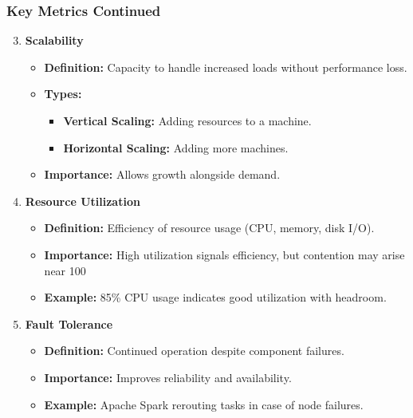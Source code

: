 \documentclass[aspectratio=169]{beamer}
\begin{document}
\begin{frame}[fragile]
    \frametitle{Key Metrics Continued}
    \begin{enumerate}
        \setcounter{enumi}{2}
        \item \textbf{Scalability}
            \begin{itemize}
                \item \textbf{Definition:} Capacity to handle increased loads without performance loss.
                \item \textbf{Types:}
                    \begin{itemize}
                        \item \textbf{Vertical Scaling:} Adding resources to a machine.
                        \item \textbf{Horizontal Scaling:} Adding more machines.
                    \end{itemize}
                \item \textbf{Importance:} Allows growth alongside demand.
            \end{itemize}

        \item \textbf{Resource Utilization}
            \begin{itemize}
                \item \textbf{Definition:} Efficiency of resource usage (CPU, memory, disk I/O).
                \item \textbf{Importance:} High utilization signals efficiency, but contention may arise near 100%
                \item \textbf{Example:} 85\% CPU usage indicates good utilization with headroom.
            \end{itemize}

        \item \textbf{Fault Tolerance}
            \begin{itemize}
                \item \textbf{Definition:} Continued operation despite component failures.
                \item \textbf{Importance:} Improves reliability and availability.
                \item \textbf{Example:} Apache Spark rerouting tasks in case of node failures.
            \end{itemize}
    \end{enumerate}
\end{frame}
\end{document}
